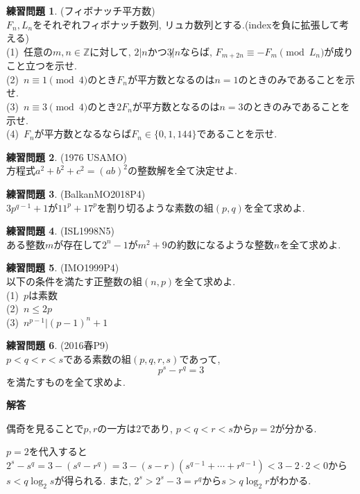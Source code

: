 \documentclass{ltjsarticle}
\theoremstyle{definition}
\newtheorem{prob}{練習問題}
\begin{document}
\begin{prob}(フィボナッチ平方数)\\
$F_n,L_n$をそれぞれフィボナッチ数列, リュカ数列とする.(indexを負に拡張して考える)\\
(1)\ 任意の$m,n\in \mathbb Z$に対して, $2|n$かつ$3\not |n$ならば, $F_{m+2n}\equiv−F_m\pmod {L_n}$が成りこと立つを示せ.\\
(2)\ $n\equiv1\pmod4$のとき$F_n$が平方数となるのは$n=1$のときのみであることを示せ.\\
(3)\ $n\equiv3\pmod4$のとき$2F_n$が平方数となるのは$n=3$のときのみであることを示せ.\\
(4)\ $F_n$が平方数となるならば$F_n\in\{0,1,144\}$であることを示せ.
\end{prob}

\begin{prob}(1976 USAMO)\\
方程式$a^2+b^2+c^2=(ab)^2$の整数解を全て決定せよ.
\end{prob}

\begin{prob}(BalkanMO2018P4)\\
$3p^{q-1}+1$が$11^p+17^p$を割り切るような素数の組$(p,q)$を全て求めよ.
\end{prob}

\begin{prob}(ISL1998N5)\\
ある整数$m$が存在して$2^n-1$が$m^2+9$の約数になるような整数$n$を全て求めよ.
\end{prob}

\begin{prob}(IMO1999P4)\\
以下の条件を満たす正整数の組$(n,p)$を全て求めよ.\\
(1)\ $p$は素数\\
(2)\ $n\leq 2p$\\
(3)\ $n^{p-1}|(p-1)^n+1$
\end{prob}

\begin{prob}(2016春P9)\\
$p<q<r<s$である素数の組$(p,q,r,s)$であって,$$p^s-r^q=3$$を満たすものを全て求めよ.
\end{prob}
\textbf{解答}

偶奇を見ることで$p,r$の一方は$2$であり, $p<q<r<s$から$p=2$が分かる.

$p=2$を代入すると$2^s-s^q=3-(s^q-r^q)=3-(s-r)(s^{q-1}+\cdots+r^{q-1})<3-2\cdot2<0$から$s<q\log_2s$が得られる. また, $2^s>2^s-3=r^q$から$s>q\log_2 r$がわかる.
\end{document}
